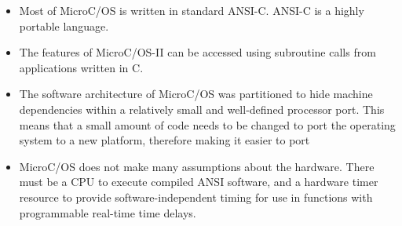 \begin{itemize}
  \item Most of MicroC/OS is written in standard ANSI-C. ANSI-C is a highly
    portable language.
  \item The features of MicroC/OS-II can be accessed using
    subroutine calls from applications written in C. 
  \item The software architecture of MicroC/OS was partitioned to hide
    machine dependencies within a relatively small and well-defined
    processor port. This means that a small amount of code needs to be changed
    to port the operating system to a new platform, therefore making it easier
    to port
  \item MicroC/OS does not make many assumptions about the hardware.
    There must be a CPU to execute compiled ANSI software, and
    a hardware timer resource to provide software-independent
    timing for use in functions with programmable real-time time delays.
\end{itemize}
